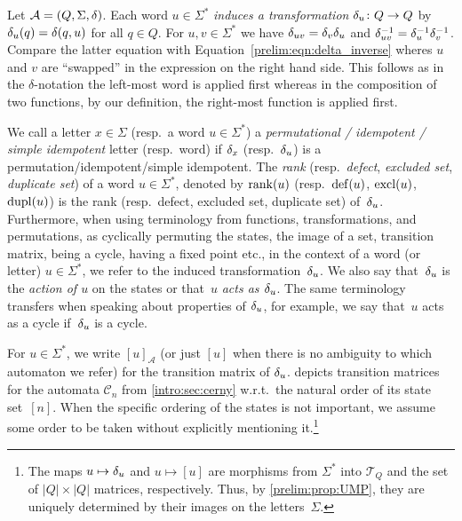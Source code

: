 
\label{def:rankword}
\label{def:defectword}
\label{def:exclword}
\label{def:duplword}
\label{def:transitionmtx} 
\label{def:fwordu}

Let $\semiautomat{A}{Q}{\Sigma}{\delta}$. Each word $u \in \Sigma^*$  \emph{induces a transformation} 
$\fword{\delta}{u} \colon Q \to Q$ by $\applyfunc{q}{\fword{\delta}{u}} = \applytrans{\delta}{q}{u}$ for all $q \in Q$. 
For $u, v \in \Sigma^*$ we have $\fword{\delta}{uv} = \concat{\fword{\delta}{u}}{\fword{\delta}{v}}$
and $\fword{\delta}{{uv}}^{-1} = \concat{\fword{\delta}{v}^{-1}}{\fword{\delta}{u}^{-1}}$.
Compare the latter equation with Equation~\eqref{prelim:eqn:delta_inverse}
wheres $u$ and $v$ are ``swapped'' in the expression on the right hand side.
This follows as in the $\delta$-notation the left-most word 
is applied first whereas in the composition of two functions, by our definition,
the right-most function is applied first.

We call a letter $x \in \Sigma$ (resp.~a word $u \in \Sigma^*$)
a \emph{permutational / idempotent / simple idempotent} letter (resp.~word) 
if $\fword{\delta}{x}$ (resp.~$\fword{\delta}{u}$) is a permutation/idempotent/simple idempotent.
The \emph{rank} (resp.~\emph{defect}, \emph{excluded set}, \emph{duplicate set}) of a word $u \in \Sigma^*$, denoted by $\rank{u}$ (resp.~$\defect{u}$, $\excl{u}$, $\dupl{u}$) 
is the rank (resp.~defect, excluded set, duplicate set) of~$\fword{\delta}{u}$. 
Furthermore, when using terminology from functions, transformations, and permutations, as cyclically permuting the states, the image of a set, transition matrix,
being a cycle, having a fixed point etc., in the context of a word (or letter) $u \in \Sigma^*$,
we refer to the induced transformation~$\fword{\delta}{u}$.
We also say that~$\fword{\delta}{u}$ is the \emph{action of $u$} on the states
or that~$u$ \emph{acts as $\fword{\delta}{u}$}. The same terminology transfers when speaking about properties of $\fword{\delta}{u}$,
for example, we say that~$u$ acts as a cycle if~$\fword{\delta}{u}$ is a cycle.

For $u \in \Sigma^*$, we write $[u]_{\mathcal A}$ (or just $[u]$ when there is no ambiguity to which automaton we refer)
for the transition matrix of $\fword{\delta}{u}$.
 depicts transition matrices for the \Cerny automata $\mathcal C_n$
from \cref{intro:sec:cerny} w.r.t.~the natural order of its state set~$[n]$.
When  the specific ordering of the states is not important, we
assume some order to be taken without explicitly mentioning it.\footnote{The maps $u \mapsto \fword{\delta}{u}$
	and $u \mapsto [u]$ are morphisms from $\Sigma^*$ into $\mathcal T_Q$ and the set of $|Q| \times |Q|$ matrices, respectively.
	Thus, by \cref{prelim:prop:UMP}, they
	are uniquely determined by their images on the letters~$\Sigma$.}

